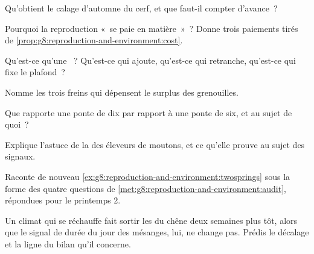 \begin{exercise}[$\star$]\label{exo:g8:reproduction-and-environment:2}
Qu'obtient le calage d'automne du cerf, et que faut-il compter
d'avance~?
\end{exercise}

\begin{exercise}[$\star$]\label{exo:g8:reproduction-and-environment:3}
Pourquoi la reproduction «~se paie en matière~»~? Donne trois
paiements tirés de
\cref{prop:g8:reproduction-and-environment:cost}.
\end{exercise}

\begin{exercise}[$\star$]\label{exo:g8:reproduction-and-environment:4}
Qu'est-ce qu'une ~? Qu'est-ce qui ajoute, qu'est-ce qui
retranche, qu'est-ce qui fixe le plafond~?
\end{exercise}

\begin{exercise}[$\star$]\label{exo:g8:reproduction-and-environment:5}
Nomme les trois freins qui dépensent le surplus des grenouilles.
\end{exercise}

\begin{exercise}[$\star$]\label{exo:g8:reproduction-and-environment:6}
Que rapporte une ponte de dix  par rapport à une ponte de six,
et au sujet de quoi~?
\end{exercise}

\begin{exercise}[$\star\star$]\label{exo:g8:reproduction-and-environment:7}
Explique l'astuce de la  des éleveurs de moutons, et ce
qu'elle prouve au sujet des signaux.
\end{exercise}

\begin{exercise}[$\star\star$]\label{exo:g8:reproduction-and-environment:8}
Raconte de nouveau \cref{ex:g8:reproduction-and-environment:twosprings}
sous la forme des quatre questions de
\cref{met:g8:reproduction-and-environment:audit}, répondues pour le
printemps 2.
\end{exercise}

\begin{exercise}[$\star\star$]\label{exo:g8:reproduction-and-environment:9}
Un climat qui se réchauffe fait sortir les  du chêne deux
semaines plus tôt, alors que le signal de durée du jour des
mésanges, lui, ne change pas. Prédis le décalage et la ligne du
bilan qu'il concerne.
\end{exercise}

